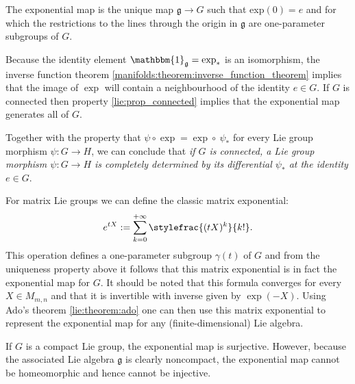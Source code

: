     \begin{property}[Uniqueness]
        The exponential map is the unique map $\mathfrak{g}\rightarrow G$ such that exp$(0) = e$ and for which the restrictions to the lines through the origin in $\mathfrak{g}$ are one-parameter subgroups of $G$.
    \end{property}
    \begin{result}\label{lie:exp_result}
        Because the identity element $\mathbbm{1}_\mathfrak{g}=\exp_\ast$ is an isomorphism, the inverse function theorem \ref{manifolds:theorem:inverse_function_theorem} implies that the image of $\exp$ will contain a neighbourhood of the identity $e\in G$. If $G$ is connected then property \ref{lie:prop_connected} implies that the exponential map generates all of $G$.

        Together with the property that $\psi\circ\exp = \exp\circ\ \psi_\ast$ for every Lie group morphism $\psi:G\rightarrow H$, we can conclude that \textit{if $G$ is connected, a Lie group morphism $\psi:G\rightarrow H$ is completely determined by its differential $\psi_\ast$ at the identity $e\in G$}.
    \end{result}

    \begin{example}
        For matrix Lie groups we can define the classic matrix exponential:
        \begin{gather}
            e^{tX} := \sum_{k=0}^{+\infty}\stylefrac{(tX)^k}{k!}.
        \end{gather}
        This operation defines a one-parameter subgroup $\gamma(t)$ of $G$ and from the uniqueness property above it follows that this matrix exponential is in fact the exponential map for $G$. It should be noted that this formula converges for every $X\in M_{m,n}$ and that it is invertible with inverse given by $\exp(-X)$. Using Ado's theorem \ref{lie:theorem:ado} one can then use this matrix exponential to represent the exponential map for any (finite-dimensional) Lie algebra.
    \end{example}

    \begin{remark}
        If $G$ is a compact Lie group, the exponential map is surjective. However, because the associated Lie algebra $\mathfrak{g}$ is clearly noncompact, the exponential map cannot be homeomorphic and hence cannot be injective.
    \end{remark}

